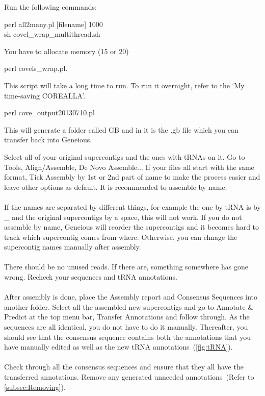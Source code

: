 \documentclass[11pt]{article}
\begin{document}
Run the following commands:
\begin{displayquote}
perl all2many.pl [filename] 1000 \\
sh covel\_wrap\_multithread.sh
\end{displayquote}
\begin{displayquote}
\footnotesize*You have to allocate memory (15 or 20)
\end{displayquote}

\begin{displayquote}
perl covels\_wrap.pl. 
\end{displayquote}
\begin{displayquote}
\footnotesize*This script will take a long time to run. To run it overnight, refer to the `My time-saving COREALLA'.
\end{displayquote}

\begin{displayquote}
perl cove\_output20130710.pl
\end{displayquote}
\begin{displayquote}
\footnotesize*This will generate a folder called GB and in it is the .gb file which you can transfer back into Geneious. \\
\end{displayquote}

Select all of your original supercontigs and the ones with tRNAs on it. Go to Tools, Align/Assemble, De Novo Assemble... If your files all start with the same format, Tick Assembly by 1st or 2nd part of name to make the process easier and leave other options as default. It is recommended to assemble by name. 
\\
\\
If the names are separated by different things, for example the one by tRNA is by \_ and the original supercontigs by a space, this will not work. If you do not assemble by name, Geneious will reorder the supercontigs and it becomes hard to track which supercontig comes from where. Otherwise, you can chnage the supercontig names manually after assembly.
\\
\\
There should be no unused reads. If there are, something somewhere has gone wrong. Recheck your sequences and tRNA annotations.
\\
\\
After assembly is done, place the Assembly report and Consensus Sequences into another folder. Select all the assembled new supercontigs and go to Annotate \& Predict at the top menu bar, Transfer Annotations and follow through. As the sequences are all identical, you do not have to do it manually. Thereafter, you should see that the consensus sequence contains both the annotations that you have manually edited as well as the new tRNA annotations~(\autoref{fig:tRNA}). 
\\
\\
Check through all the consensus sequences and ensure that they all have the transferred annotations. Remove any generated unneeded annotations~(Refer to \autoref{subsec:Removing}).
\end{document}
